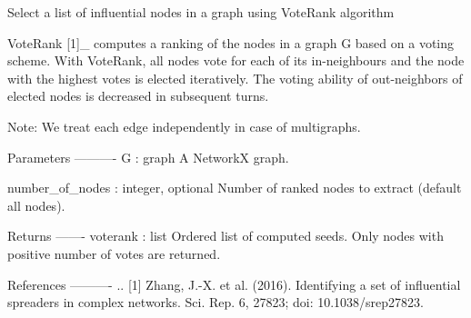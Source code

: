 \begin{DoxyVerb}Select a list of influential nodes in a graph using VoteRank algorithm

VoteRank [1]_ computes a ranking of the nodes in a graph G based on a
voting scheme. With VoteRank, all nodes vote for each of its in-neighbours
and the node with the highest votes is elected iteratively. The voting
ability of out-neighbors of elected nodes is decreased in subsequent turns.

Note: We treat each edge independently in case of multigraphs.

Parameters
----------
G : graph
    A NetworkX graph.

number_of_nodes : integer, optional
    Number of ranked nodes to extract (default all nodes).

Returns
-------
voterank : list
    Ordered list of computed seeds.
    Only nodes with positive number of votes are returned.

References
----------
.. [1] Zhang, J.-X. et al. (2016).
    Identifying a set of influential spreaders in complex networks.
    Sci. Rep. 6, 27823; doi: 10.1038/srep27823.
\end{DoxyVerb}
 